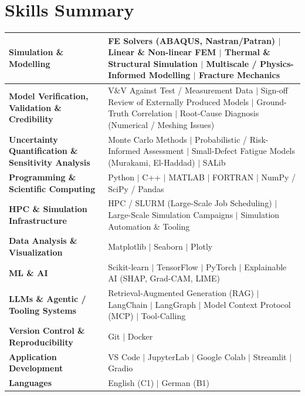 \documentclass[a4paper,20pt]{article}
\begin{document}
\section{\color{blue}Skills Summary}
\begin{tabular}{|p{8cm}p{10.5cm}|}

\hline
\textbf{Simulation \& Modelling} &
FE Solvers (ABAQUS, Nastran/Patran) \(\vert\) Linear \& Non-linear FEM \(\vert\) Thermal \& Structural Simulation \(\vert\) Multiscale / Physics-Informed Modelling \(\vert\) Fracture Mechanics \\
\hline

\textbf{Model Verification, Validation \& Credibility} &
V\&V Against Test / Measurement Data \(\vert\) Sign-off Review of Externally Produced Models \(\vert\) Ground-Truth Correlation \(\vert\) Root-Cause Diagnosis (Numerical / Meshing Issues) \\
\hline

\textbf{Uncertainty Quantification \& Sensitivity Analysis} &
Monte Carlo Methods \(\vert\) Probabilistic / Risk-Informed Assessment \(\vert\) Small-Defect Fatigue Models (Murakami, El-Haddad) \(\vert\) SALib \\
\hline

\textbf{Programming \& Scientific Computing} &
Python \(\vert\) C++ \(\vert\) MATLAB \(\vert\) FORTRAN \(\vert\) NumPy / SciPy / Pandas \\
\hline

\textbf{HPC \& Simulation Infrastructure} &
HPC / SLURM (Large-Scale Job Scheduling) \(\vert\) Large-Scale Simulation Campaigns \(\vert\) Simulation Automation \& Tooling \\
\hline

\textbf{Data Analysis \& Visualization} &
Matplotlib \(\vert\) Seaborn \(\vert\) Plotly \\
\hline

\textbf{ML \& AI} &
Scikit-learn \(\vert\) TensorFlow \(\vert\) PyTorch \(\vert\) Explainable AI (SHAP, Grad-CAM, LIME) \\
\hline

\textbf{LLMs \& Agentic / Tooling Systems} &
Retrieval-Augmented Generation (RAG) \(\vert\) LangChain \(\vert\) LangGraph \(\vert\) Model Context Protocol (MCP) \(\vert\) Tool-Calling \\
\hline

\textbf{Version Control \& Reproducibility} &
Git \(\vert\) Docker \\
\hline

\textbf{Application Development} &
VS Code \(\vert\) JupyterLab \(\vert\) Google Colab \(\vert\) Streamlit \(\vert\) Gradio \\
\hline

\textbf{Languages} &
English (C1) \(\vert\) German (B1) \\
\hline
\end{tabular}
\end{document}
